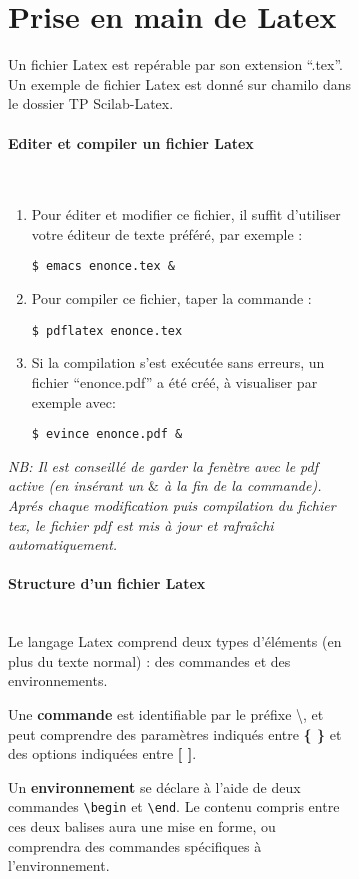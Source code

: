 \documentclass[a4paper,11pt]{article}
\begin{document}
\begin{figure}
\begin{figure}
\section{Prise en main de Latex}

Un fichier Latex est repérable par son extension ``.tex''.  Un exemple
de fichier Latex est donné sur chamilo dans le dossier TP Scilab-Latex.

\paragraph{Editer et compiler un fichier Latex} \
\begin{enumerate}
\item Pour éditer et modifier ce fichier, il suffit d'utiliser votre
  éditeur de texte préféré, par exemple :
\begin{verbatim}
$ emacs enonce.tex &
\end{verbatim}
\item Pour compiler ce fichier, taper la commande :
\begin{verbatim}
$ pdflatex enonce.tex
\end{verbatim}
\item Si la compilation s'est exécutée sans erreurs, un fichier
  ``enonce.pdf'' a été créé, à visualiser par exemple avec:
\begin{verbatim}
$ evince enonce.pdf &
\end{verbatim}
\end{enumerate}
{\it NB: Il est conseillé de garder la fenètre avec le pdf active (en
insérant un $\&$ à la fin de la commande). Aprés chaque modification
puis compilation du fichier tex, le fichier pdf est mis à jour et
rafraîchi automatiquement.}

\paragraph{Structure d'un fichier Latex} \ \\
Le langage Latex comprend deux types d'éléments (en plus du texte normal) : des commandes et des environnements.

Une \textbf{commande} est identifiable par le préfixe \textbackslash , et peut comprendre des paramètres indiqués entre \textbf{\{ \}} et des options indiquées entre \textbf{[ ]}.

Un \textbf{environnement} se déclare à l'aide de deux commandes {\tt \textbackslash begin} et {\tt \textbackslash end}. Le contenu compris entre ces deux balises aura une mise en forme, ou comprendra des commandes spécifiques à l'environnement.


\end{figure}
\end{figure}
\end{document}

